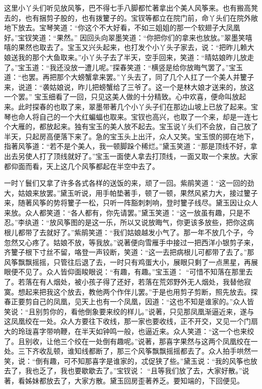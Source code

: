 \begin{parag}
    这里小丫头们听见放风筝，巴不得七手八脚都忙著拿出个美人风筝来。也有搬高凳去的，也有捆剪子股的，也有拨籰子的。宝钗等都立在院门前，命丫头们在院外敞地下放去。宝琴笑道：“你这个不大好看，不如三姐姐的那一个软翅子大凤凰好。”宝钗笑道：“果然。” 因回头向翠墨笑道：“你把你们的拿来也放放。”翠墨笑嘻嘻的果然也取去了。宝玉又兴头起来，也打发个小丫头子家去，说：“把昨儿赖大娘送我的那个大鱼取来。”小丫头子去了半天，空手回来，笑道：“晴姑娘昨儿放走了。”宝玉道：“我还没放一遭儿呢。”探春笑道：“横竖是给你放晦气罢了。”宝玉道：“也罢。再把那个大螃蟹拿来罢。”丫头去了，同了几个人扛了一个美人并籰子来，说道：“袭姑娘说，昨儿把螃蟹给了三爷了。这一个是林大娘才送来的，放这一个罢。” 宝玉细看了一回，只见这美人做的十分精致。心中欢喜，便命叫放起来。此时探春的也取了来，翠墨带著几个小丫头子们在那边山坡上已放了起来。宝琴也命人将自己的一个大红蝙蝠也取来。宝钗也高兴，也取了一个来，却是一连七个大雁的，都放起来。独有宝玉的美人放不起去。宝玉说丫头们不会放，自己放了半天，只起房高便落下来了。急的宝玉头上出汗，众人又笑。宝玉恨的掷在地下，指著风筝道：“若不是个美人，我一顿脚跺个稀烂。”黛玉笑道：“那是顶线不好，拿出去另使人打了顶线就好了。”宝玉一面使人拿去打顶线，一面又取一个来放。大家都仰面而看，天上这几个风筝都起在半空中去了。
\end{parag}


\begin{parag}
    一时丫鬟们又拿了许多各式各样的送饭的来，顽了一回。紫鹃笑道：“这一回的劲大，姑娘来放罢。”黛玉听说，用手帕垫著手，顿了一顿，果然风紧力大，接过籰子来，随著风筝的势将籰子一松，只听一阵豁刺刺响，登时籰子线尽。黛玉因让众人来放。众人都笑道：“各人都有，你先请罢。”黛玉笑道：“这一放虽有趣，只是不忍。”李纨道：“放风筝图的是这一乐，所以又说放晦气，你更该多放些，把你这病根儿都带了去就好了。”紫鹃笑道：“我们姑娘越发小气了。那一年不放几个子，今忽然又心疼了。姑娘不放，等我放。”说著便向雪雁手中接过一把西洋小银剪子来，齐籰子根下寸丝不留，咯登一声铰断，笑道：“这一去把病根儿可都带了去了。”那风筝飘飘摇摇，只管往后退了去，一时只有鸡蛋大小，展眼只剩了一点黑星，再展眼便不见了。众人皆仰面睃眼说：“有趣，有趣。”宝玉道： “可惜不知落在那里去了。若落在有人烟处，被小孩子得了还好，若落在荒郊野外无人烟处，我替他寂寞。想起来把我这个放去，教他两个作伴儿罢。”于是也用剪子剪断，照先放去。探春正要剪自己的凤凰，见天上也有一个凤凰，因道：“这也不知是谁家的。”众人皆笑说：“且别剪你的，看他倒象要来绞的样儿。”说著，只见那凤凰渐逼近来，遂与这凤凰绞在一处。众人方要往下收线，那一家也要收线，正不开交，又见一个门扇大的玲珑喜字带响鞭，在半天如钟鸣一般，也逼近来。众人笑道：“这一个也来绞了。且别收，让他三个绞在一处倒有趣呢。”说著，那喜字果然与这两个凤凰绞在一处。三下齐收乱顿，谁知线都断了，那三个风筝飘飘摇摇都去了。众人拍手哄然一笑，说：“倒有趣，可不知那喜字是谁家的，忒促狭了些。”黛玉说：“我的风筝也放去了，我也乏了，我也要歇歇去了。”宝钗说： “且等我们放了去，大家好散。”说著，看姊妹都放去了，大家方散。黛玉回房歪著养乏。要知端的，下回便见。
\end{parag}


